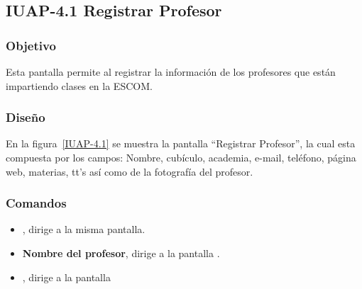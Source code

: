 \subsection{IUAP-4.1  Registrar  Profesor}

\subsubsection{Objetivo}

	
    Esta pantalla permite al   registrar la información de los profesores que están impartiendo clases en la ESCOM.
\subsubsection{Diseño}


    En la figura~\ref{IUAP-4.1} se muestra la pantalla ``Registrar Profesor'', la cual esta compuesta por los campos: Nombre, cubículo, academia, e-mail, teléfono, página web, materias, tt's así como de la fotografía del profesor.



\subsubsection{Comandos}
    \begin{itemize}
	\item {}, dirige a la misma pantalla.
	\item \textbf{Nombre del profesor}, dirige a la pantalla .
	\item {}, dirige a la pantalla 
    \end{itemize}
